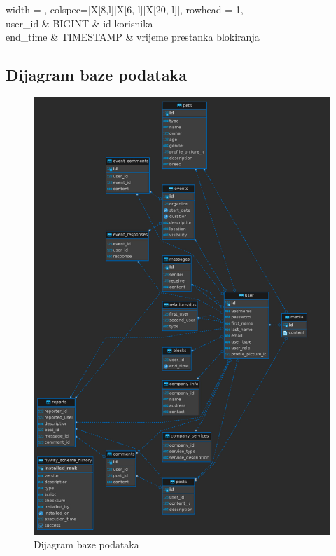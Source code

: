 				\begin{longtblr}[
					label=none,
					entry=none
					]{
						width = \textwidth,
						colspec={|X[8,l]|X[6, l]|X[20, l]|}, 
						rowhead = 1,
					} %
					\hline {}	 \\ \hline[3pt]
					user\_id & BIGINT & id korisnika		\\ \hline
					end\_time & TIMESTAMP & vrijeme prestanka blokiranja		\\ \hline
				\end{longtblr}
			
			\subsection{Dijagram baze podataka}
				\begin{figure}[H]
					\includegraphics[scale = 0.37]{slike/dijagram_baze.jpeg}
					\centering
					\caption{Dijagram baze podataka}
					\label{fig:dijagram_baze}
				\end{figure}
			
